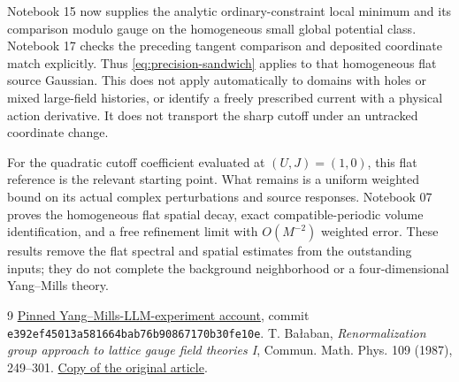 \documentclass[11pt]{article}
\theoremstyle{remark}
\begin{document}
Notebook 15 now supplies the analytic ordinary-constraint local
minimum and its comparison modulo gauge on the homogeneous small
global potential class. Notebook 17 checks the preceding tangent
comparison and deposited coordinate match explicitly. Thus
\eqref{eq:precision-sandwich} applies to that homogeneous flat
source Gaussian. This does not apply automatically to domains
with holes or mixed large-field
histories, or identify a freely prescribed current with a physical
action derivative. It does not transport the sharp cutoff under
an untracked coordinate change.

For the quadratic cutoff coefficient evaluated at $(U,J)=(1,0)$,
this flat reference is the relevant starting point. What remains
is a uniform weighted bound on its actual complex perturbations
and source responses. Notebook 07 proves the homogeneous flat spatial
decay, exact compatible-periodic volume identification, and a free
refinement limit with $O(M^{-2})$ weighted error. These results remove
the flat spectral and spatial estimates from the outstanding inputs;
they do not complete the background neighborhood or a four-dimensional
Yang--Mills theory.

\begin{thebibliography}{9}
 \href{https://github.com/ethanwsussman/Yang--Mills-LLM-experiment/tree/e392ef45013a581664bab76b90867170b30fe10e}
{Pinned Yang--Mills-LLM-experiment account}, commit
\texttt{e392ef45013a581664bab76b90867170b30fe10e}.
 T. Ba\l aban,
\emph{Renormalization group approach to lattice gauge field theories I},
Commun. Math. Phys. 109 (1987), 249--301.
\href{https://scispace.com/pdf/renormalization-group-approach-to-lattice-gauge-field-3ygai0vxt1.pdf}
{Copy of the original article}.
\end{thebibliography}
\end{document}
